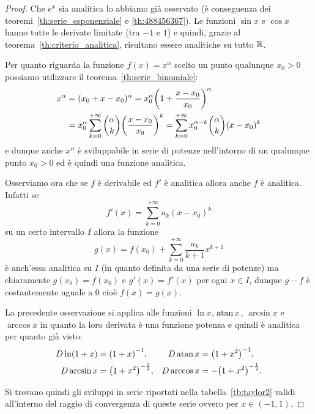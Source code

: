 \begin{proof}
  Che $e^x$ sia analitica lo abbiamo già osservato
  (è conseguenza dei teoremi~\ref{th:serie_esponenziale}
  e \ref{th:488456367}).
  Le funzioni $\sin x$ e $\cos x$ hanno tutte le derivate 
  limitate (tra $-1$ e $1$)
  e quindi, grazie al teorema~\ref{th:criterio_analitica},
  risultano essere analitiche su tutto ${\mathbb R}$.
  
  Per quanto riguarda la funzione $f(x)=x^\alpha$ 
  scelto un punto qualunque $x_0>0$
  possiamo utilizzare il teorema~\ref{th:serie_binomiale}:
    \begin{align*}
    x^\alpha
    &= (x_0 + x-x_0)^\alpha
    = x_0^\alpha {\left( 1+\frac {x-x_0} {x_0} \right)}^\alpha \\
    &= x_0^\alpha \sum_{k=0}^{+\infty} {\alpha \choose k} {\left( \frac{x-x_0}{x_0} \right)}^k
    = \sum_{k=0}^{+\infty} x_0^{\alpha-k}{\alpha \choose k} (x-x_0)^k
  \end{align*}
  e dunque anche $x^\alpha$ è sviluppabile in serie di potenze
  nell'intorno di un qualunque punto $x_0>0$ ed è quindi una
  funzione analitica.

  Osserviamo ora che se $f$ è derivabile ed $f'$ è analitica
  allora anche
  $f$ è analitica. Infatti se
  \[
    f'(x) = \sum_{k=0}^{+\infty} a_k (x-x_0)^k
  \]
  su un certo intervallo $I$
  allora la funzione
  \begin{equation}\label{eq:4569903}
    g(x) = f(x_0) + \sum_{k=0}^{+\infty} \frac{a_k}{k+1}x^{k+1}
  \end{equation}
  è anch'essa analitica su $I$ (in quanto definita da una serie di potenze)
  ma chiaramente $g(x_0) = f(x_0)$ e $g'(x) = f'(x)$ per ogni $x\in I$,
  dunque $g-f$ è costantemente uguale a $0$ cioè $f(x) = g(x)$.

  La precedente osservazione si applica alle funzioni 
  $\ln x$, $\operatorname{atan} x$, $\arcsin x$ e $\arccos x$ 
  in quanto la loro derivata è una funzione potenza e quindi
  è analitica per quanto già visto:
  \begin{align*}
    D \ln (1+x) &= {\left( 1+x \right)}^{-1}, &
    D \operatorname{atan} x &= {\left( 1+x^2 \right)}^{-1}, \\
    D \arcsin x &= {\left( 1+x^2 \right)}^{-\frac 1 2}, &
    D \arccos x &= -{\left( 1+x^2 \right)}^{-\frac 1 2}.
  \end{align*}

  Si trovano quindi gli sviluppi in serie riportati nella tabella~\ref{tb:taylor2}
  validi all'interno del raggio di convergenza di queste serie ovvero per $x\in (-1,1)$.


\end{proof}
